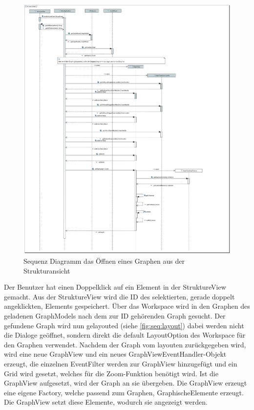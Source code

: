 \begin{figure}[!htbp]
	\centering
	\includegraphics[width=450pt]{resourcen/SeqDiagramOpenGraph.PDF}
	\caption{Sequenz Diagramm das Öffnen eines Graphen aus der Strukturansicht}
	\label{fig:seq:openMethod}
\end{figure}

Der Benutzer hat einen Doppelklick auf ein Element in der StruktureView gemacht. Aus der StruktureView wird die ID des selektierten, gerade doppelt angeklickten, Elements gespeichert. Über das Workspace wird in den Graphen des geladenen GraphModels nach dem zur ID gehörenden Graph gesucht. Der gefundene Graph wird nun gelayouted (siehe \ref{fig:seq:layout}) dabei werden nicht die Dialoge geöffnet, sondern direkt die default LayoutOption des Workspace für den Graphen verwendet. Nachdem der Graph vom layouten zurückgegeben wird, wird eine neue GraphView und ein neues GraphViewEventHandler-Objekt erzeugt, die einzelnen EventFilter werden zur GraphView hinzugefügt und ein Grid wird gesetzt, welches für die Zoom-Funktion benötigt wird. Ist die GraphView aufgesetzt, wird der Graph an sie übergeben. Die GraphView erzeugt eine eigene Factory, welche passend zum Graphen, GraphischeElemente erzeugt. Die GraphView setzt diese Elemente, wodurch sie angezeigt werden.

